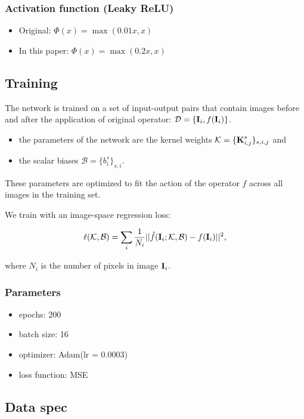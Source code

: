 \documentclass{article}
\newcommand{\tb}{\textbf}
\begin{document}
\subsubsection*{Activation function (Leaky ReLU)}

\begin{itemize}
    \item Original: $\Phi(x) = \max(0.01x, x)$
    \item In this paper: $\Phi(x) = \max(0.2x, x)$
\end{itemize}

\subsection*{Training}

The network is trained on a set of input-output pairs that contain images before and after the application of original operator: $\mathcal D = \{\tb I_i, f(\tb I_i)\}$.

\begin{itemize}
    \item the parameters of the network are the kernel weights $\mathcal K = \{\tb K_{i, j}^s\}_{s, i, j}$ and
    \item the scalar biases $\mathcal B = \{b_i^s\}_{s, i}$.
\end{itemize}

These parameters are optimized to fit the action of the operator $f$ across all images in the training set.

We train with an image-space regression loss:

$$\ell(\mathcal K, \mathcal B) = \sum\limits_i \frac{1}{N_i} ||\hat f(\tb I_i; \mathcal K, \mathcal B) - f(\tb I_i)||^2,$$

where $N_i$ is the number of pixels in image $\tb I_i$.

\subsubsection*{Parameters}

\begin{itemize}
    \item epochs: 200
    \item batch size: 16
    \item optimizer: Adam(lr = 0.0003)
    \item loss function: MSE
\end{itemize}

\subsection*{Data spec}
\end{document}
